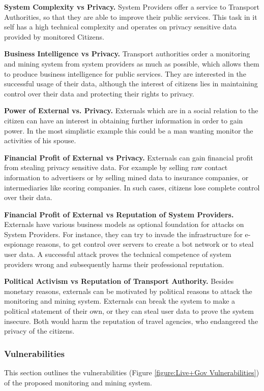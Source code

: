 \documentclass[runningheads,a4paper]{llncs}
\begin{document}
\textbf{System Complexity vs Privacy.}
System Providers offer a service to Transport Authorities, so that they are able to improve their public services. This task in it self has a high technical complexity and operates on privacy sensitive data provided by monitored Citizens.

\textbf{Business Intelligence vs Privacy.}
Transport authorities order a monitoring and mining system from system providers as much as possible, which allows them to produce business intelligence for public services. They are interested in the successful usage of their data, although the interest of citizens lies in maintaining control over their data and protecting their rights to privacy.

\textbf{Power of External vs. Privacy.}
Externals which are in a social relation to the citizen can have an interest in obtaining further information in order to gain power. In the most simplistic example this could be a man wanting monitor the activities of his spouse.


\textbf{Financial Profit of External vs Privacy.}
Externals can gain financial profit from stealing privacy sensitive data.
For example by selling raw contact information to advertisers or by selling mined data to insurance companies, or intermediaries like scoring companies. In such cases, citizens lose complete control over their data.


\textbf{Financial Profit of External vs Reputation of System Providers.}
Externals have various business models as optional foundation for attacks on System Providers.
For instance, they can try to invade the infrastructure for e-espionage reasons, to get control over servers to create a bot network or to steal user data. A successful attack proves the technical competence of system providers wrong and subsequently harms their professional reputation.


\textbf{Political Activism vs Reputation of Transport Authority.}
Besides monetary reasons, externals can be motivated by political reasons to attack the monitoring and mining system.
Externals can break the system to make a political statement of their own,
or they can steal user data to prove the system insecure.
Both would harm the reputation of travel agencies, who endangered the privacy of the citizens.


\subsubsection{Vulnerabilities}
\label{subsubsection:Vulnerabilities}
This section outlines the vulnerabilities (Figure \ref{figure:Live+Gov Vulnerabilities}) of the proposed monitoring and mining system. 
\end{document}
